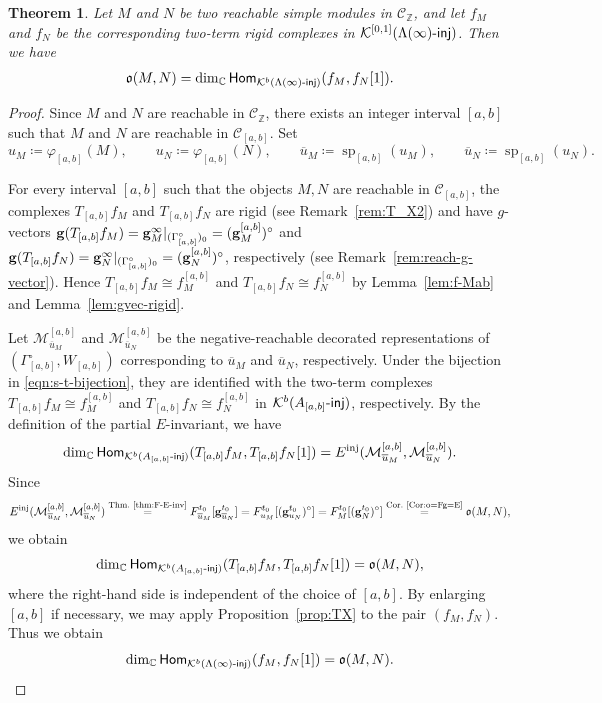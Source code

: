 \documentclass[12pt]{amsart}
\newtheorem{theorem}{Theorem}[section]
\theoremstyle{definition}
\theoremstyle{remark}
\numberwithin{equation}{section}
\newcommand{\opname}[1]{\operatorname{\mathsf{#1}}}
\newcommand{\Hom}{\opname{Hom}}
\newcommand{\injc}{\mathchar`-\mathsf{inj}}
\begin{document}
\begin{theorem}\label{Thm:oMN=Ext1}
Let $M$ and $N$ be two reachable simple modules in $\mathcal{C}_{\mathbb{Z}}$, and let $f_M$ and $f_N$ be the corresponding two-term rigid complexes in $\mathcal{K}^{[0,1]}(\Lambda(\infty)\injc)$. Then we have
\begin{eqnarray}\label{eqn:o-E-infty}
    \mathfrak{o}(M,N) = \dim_{\mathbb{C}}\Hom_{\mathcal{K}^b(\Lambda(\infty)\injc)}(f_M, f_N[1]).
\end{eqnarray}
\end{theorem}
\begin{proof}
Since $M$ and $N$ are reachable in $\mathcal C_{\mathbb Z}$, there exists an integer interval $[a,b]$ such that 
$M$ and $N$ are reachable in $\mathcal{C}_{[a,b]}$. 
Set
\[
u_M\coloneqq\varphi_{[a,b]}(M),\qquad
u_N\coloneqq\varphi_{[a,b]}(N),\qquad
\overline{u}_M\coloneqq\operatorname{sp}_{[a,b]}(u_M),\qquad
\overline{u}_N\coloneqq\operatorname{sp}_{[a,b]}(u_N).
\]

For every interval $[a,b]$ such that the objects $M, N$ are reachable in $\mathcal C_{[a,b]}$, the complexes $T_{[a,b]}f_M$ and $T_{[a,b]}f_N$ are rigid (see Remark~\ref{rem:T_X2}) and have $g$-vectors ${\bf g}(T_{[a,b]}f_M)={\bf g}_M^\infty|_{(\Gamma_{[a,b]}^\circ)_0}=({\bf g}_M^{[a,b]})^\circ$ and ${\bf g}(T_{[a,b]}f_N)={\bf g}_N^\infty|_{(\Gamma_{[a,b]}^\circ)_0}=({\bf g}_N^{[a,b]})^\circ$, respectively (see Remark~\ref{rem:reach-g-vector}). Hence $T_{[a,b]}f_M\cong f_M^{[a,b]}$ and $T_{[a,b]}f_N\cong f_N^{[a,b]}$ by Lemma~\ref{lem:f-Mab} and Lemma~\ref{lem:gvec-rigid}.

Let $\mathcal M_{\overline{u}_M}^{[a,b]}$ and $\mathcal M_{\overline{u}_N}^{[a,b]}$ be the negative-reachable decorated representations of $(\Gamma_{[a,b]}^\circ, W_{[a,b]})$ corresponding to $\overline{u}_M$ and $\overline{u}_N$, respectively.
Under the bijection in \eqref{eqn:s-t-bijection}, they are identified with the two-term complexes $T_{[a,b]}f_M\cong f_M^{[a,b]}$ and $T_{[a,b]}f_N\cong f_N^{[a,b]}$ in $\mathcal K^b(A_{[a,b]}\injc)$, respectively.
By the definition of the partial $E$-invariant, we have
\[
\dim_{\mathbb{C}}\Hom_{\mathcal K^b(A_{[a,b]}\injc)}(T_{[a,b]}f_M,T_{[a,b]}f_N[1])
=E^{\mathrm{inj}}(\mathcal M_{\overline{u}_M}^{[a,b]},\mathcal M_{\overline{u}_N}^{[a,b]}).
\]
Since \begin{eqnarray*}
   E^{\mathrm{inj}}(\mathcal M_{\overline{u}_M}^{[a,b]},\mathcal M_{\overline{u}_N}^{[a,b]})
\overset{\text{Thm.~\ref{thm:F-E-inv}}}{=}F_{\overline{u}_M}^{t_0}[{\bf g}_{\overline{u}_N}^{t_0}]
=F_{u_M}^{t_0}[({\bf g}_{u_N}^{t_0})^\circ]
=F_M^{t_0}[({\bf g}_N^{t_0})^\circ]
\overset{\text{Cor.~\ref{Cor:o=Fg=E}}}{=}
\mathfrak{o}(M,N),
\end{eqnarray*}
we obtain
\[
\dim_{\mathbb{C}}\Hom_{\mathcal K^b(A_{[a,b]}\injc)}(T_{[a,b]}f_M,T_{[a,b]}f_N[1])=\mathfrak{o}(M,N),
\]
where the right-hand side is independent of the choice of $[a,b]$.
By enlarging $[a,b]$ if necessary, we may apply Proposition~\ref{prop:TX} to the pair $(f_M,f_N)$. Thus we obtain
\[\dim_{\mathbb{C}} \Hom_{\mathcal{K}^b(\Lambda(\infty)\injc)}(f_M, f_N[1]) =\mathfrak{o}(M,N).\qedhere\]
\end{proof}
\end{document}
